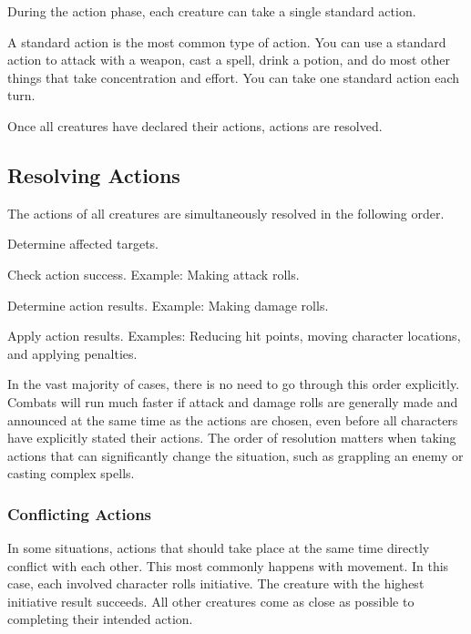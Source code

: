 During the action phase, each creature can take a single standard action.

 A standard action is the most common type of action. You can use a standard action to attack with a weapon, cast a spell, drink a potion, and do most other things that take concentration and effort. You can take one standard action each turn.

Once all creatures have declared their actions, actions are resolved.

\subsection{Resolving Actions}\label{Resolving Actions}

The actions of all creatures are simultaneously resolved in the following order.

\begin{enumerate*}
    \item Determine affected targets.
    \item Check action success. Example: Making attack rolls.
    \item Determine action results. Example: Making damage rolls.
    \item Apply action results. Examples: Reducing hit points, moving character locations, and applying penalties.
\end{enumerate*}

In the vast majority of cases, there is no need to go through this order explicitly. Combats will run much faster if attack and damage rolls are generally made and announced at the same time as the actions are chosen, even before all characters have explicitly stated their actions. The order of resolution matters when taking actions that can significantly change the situation, such as grappling an enemy or casting complex spells.

\subsubsection{Conflicting Actions}\label{Conflicting Actions}

In some situations, actions that should take place at the same time directly conflict with each other. This most commonly happens with movement. In this case, each involved character rolls initiative. The creature with the highest initiative result succeeds. All other creatures come as close as possible to completing their intended action.

